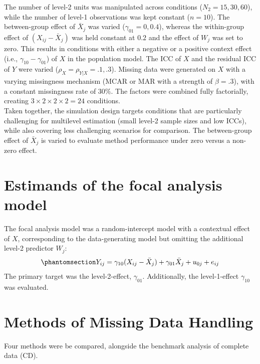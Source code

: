 \documentclass[
  letterpaper,
  11pt,
  english,
  singlespacing,
  headsepline,
  openany]{MastersDoctoralThesis}
\begin{document}
The number of level-2 units was manipulated across conditions
(\(N_2 = 15, 30, 60\)), while the number of level-1 observations was
kept constant (\(n = 10\)). The between-group effect of \(\bar{X}_{j}\)
was varied (\(\gamma_{01} = 0, 0.4\)), whereas the within-group effect
of \((X_{ij}-\bar{X}_{j})\) was held constant at \(0.2\) and the effect
of \(W_{j}\) was set to zero. This results in conditions with either a
negative or a positive context effect (i.e.,
\(\gamma_{10} - \gamma_{01}\)) of \(X\) in the population model. The ICC
of \(X\) and the residual ICC of \(Y\) were varied
(\(\rho_X = \rho_{Y|X} = .1, .3\)). Missing data were generated on \(X\)
with a varying missingness mechanism (MCAR or MAR with a strength of
\(\beta = .3\)), with a constant missingness rate of \(30\%\). The
factors were combined fully factorially, creating
\(3 \times 2 \times 2 \times 2 = 24\) conditions.\\
Taken together, the simulation design targets conditions that are
particularly challenging for multilevel estimation (small level-2 sample
sizes and low ICCs), while also covering less challenging scenarios for
comparison. The between-group effect of \(\bar{X}_{j}\) is varied to
evaluate method performance under zero versus a non-zero effect.

\section{Estimands of the focal analysis
model}\label{estimands-of-the-focal-analysis-model}

The focal analysis model was a random-intercept model with a contextual
effect of \(X\), corresponding to the data-generating model but omitting
the additional level-2 predictor \(W_j\):
\begin{equation}\phantomsection\label{eq-fam}{
\begin{aligned}
Y_{ij} =\gamma_{10} (X_{ij} - \bar{X}_j) +\gamma_{01} \bar{X}_j + u_{0j} + e_{ij} 
\end{aligned}
}\end{equation} The primary target was the level-2-effect,
\(\gamma_{01}\). Additionally, the level-1-effect \(\gamma_{10}\) was
evaluated.

\section{Methods of Missing Data
Handling}\label{methods-of-missing-data-handling}

Four methods were be compared, alongside the benchmark analysis of
complete data (CD).
\end{document}
